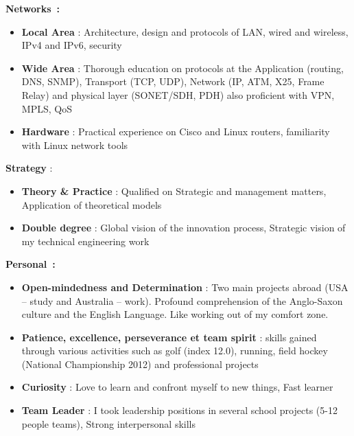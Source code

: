 \documentclass[]{friggeri-cv} %
\begin{document}
\textbf{\large Networks~:}
\vspace{-2mm} 
\begin{itemize}[noitemsep,nolistsep]
\item \textbf{Local Area} : Architecture, design and protocols of LAN, wired and wireless, IPv4 and IPv6, security
\item \textbf{Wide Area} : Thorough education on protocols at the Application (routing, DNS, SNMP), Transport (TCP, UDP), Network (IP, ATM, X25, Frame Relay) and physical layer (SONET/SDH, PDH) also proficient with VPN, MPLS, QoS
\item \textbf{Hardware} : Practical experience on Cisco and Linux routers, familiarity with Linux network tools
\end{itemize}

\textbf{\large Strategy} :
\vspace{-2mm}
\begin{itemize}[noitemsep,nolistsep]
\item \textbf{Theory \& Practice} : Qualified on Strategic and management matters, Application of theoretical models
\item \textbf{Double degree} : Global vision of the innovation process, Strategic vision of my technical engineering work
\end{itemize}
\vspace{-2mm}
\textbf{\large Personal~:} 
\begin{itemize}[noitemsep,nolistsep]
\item \textbf{Open-mindedness and Determination} : Two main projects abroad (USA -- study and Australia -- work). Profound comprehension of the Anglo-Saxon culture and the English Language. Like working out of my comfort zone.
\item \textbf{Patience, excellence, perseverance et team spirit} : skills gained through various activities such as golf (index 12.0), running, field hockey (National Championship 2012) and professional projects
\item \textbf{Curiosity} : Love to learn and confront myself to new things, Fast learner 
\item \textbf{Team Leader} : I took leadership positions in several school projects (5-12 people teams), Strong interpersonal skills
\end{itemize}


\end{document}
